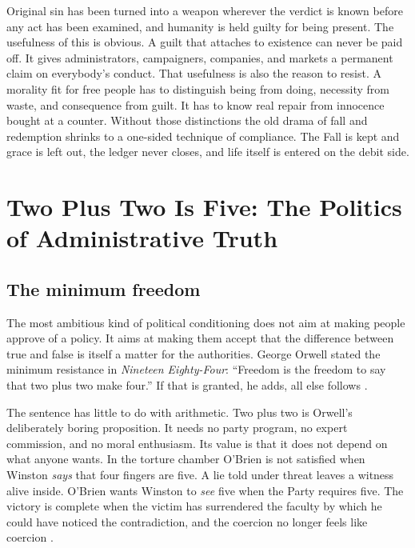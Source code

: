 \documentclass[12pt,a4paper]{book}
\begin{document}
Original sin has been turned into a weapon wherever the verdict is known before any act has been examined, and humanity is held guilty for being present. The usefulness of this is obvious. A guilt that attaches to existence can never be paid off. It gives administrators, campaigners, companies, and markets a permanent claim on everybody's conduct. That usefulness is also the reason to resist. A morality fit for free people has to distinguish being from doing, necessity from waste, and consequence from guilt. It has to know real repair from innocence bought at a counter. Without those distinctions the old drama of fall and redemption shrinks to a one-sided technique of compliance. The Fall is kept and grace is left out, the ledger never closes, and life itself is entered on the debit side.


\chapter[Two Plus Two Is Five]{Two Plus Two Is Five: The Politics of Administrative Truth}
\label{chap:two-plus-two-five}

\section{The minimum freedom}

The most ambitious kind of political conditioning does not aim at making people approve of a policy. It aims at making them accept that the difference between true and false is itself a matter for the authorities. George Orwell stated the minimum resistance in \emph{Nineteen Eighty-Four}: ``Freedom is the freedom to say that two plus two make four.'' If that is granted, he adds, all else follows \cite[Part~I, chap.~7]{Orwell-1984}.

The sentence has little to do with arithmetic. Two plus two is Orwell's deliberately boring proposition. It needs no party program, no expert commission, and no moral enthusiasm. Its value is that it does not depend on what anyone wants. In the torture chamber O'Brien is not satisfied when Winston \emph{says} that four fingers are five. A lie told under threat leaves a witness alive inside. O'Brien wants Winston to \emph{see} five when the Party requires five. The victory is complete when the victim has surrendered the faculty by which he could have noticed the contradiction, and the coercion no longer feels like coercion \cite[Part~III, chap.~2]{Orwell-1984}.
\end{document}
